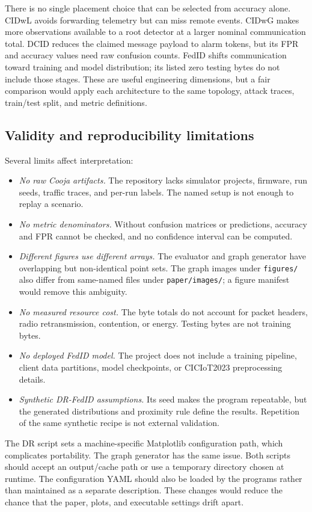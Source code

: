 \documentclass[conference]{IEEEtran}
\begin{document}
There is no single placement choice that can be selected from accuracy alone. CIDwL avoids forwarding telemetry but can miss remote events. CIDwG makes more observations available to a root detector at a larger nominal communication total. DCID reduces the claimed message payload to alarm tokens, but its FPR and accuracy values need raw confusion counts. FedID shifts communication toward training and model distribution; its listed zero testing bytes do not include those stages. These are useful engineering dimensions, but a fair comparison would apply each architecture to the same topology, attack traces, train/test split, and metric definitions.

\subsection{Validity and reproducibility limitations}
Several limits affect interpretation:
\begin{itemize}
    \item \textit{No raw Cooja artifacts.} The repository lacks simulator projects, firmware, run seeds, traffic traces, and per-run labels. The named setup is not enough to replay a scenario.
    \item \textit{No metric denominators.} Without confusion matrices or predictions, accuracy and FPR cannot be checked, and no confidence interval can be computed.
    \item \textit{Different figures use different arrays.} The evaluator and graph generator have overlapping but non-identical point sets. The graph images under \texttt{figures/} also differ from same-named files under \texttt{paper/images/}; a figure manifest would remove this ambiguity.
    \item \textit{No measured resource cost.} The byte totals do not account for packet headers, radio retransmission, contention, or energy. Testing bytes are not training bytes.
    \item \textit{No deployed FedID model.} The project does not include a training pipeline, client data partitions, model checkpoints, or CICIoT2023 preprocessing details.
    \item \textit{Synthetic DR-FedID assumptions.} Its seed makes the program repeatable, but the generated distributions and proximity rule define the results. Repetition of the same synthetic recipe is not external validation.
\end{itemize}

The DR script sets a machine-specific Matplotlib configuration path, which complicates portability. The graph generator has the same issue. Both scripts should accept an output/cache path or use a temporary directory chosen at runtime. The configuration YAML should also be loaded by the programs rather than maintained as a separate description. These changes would reduce the chance that the paper, plots, and executable settings drift apart.
\end{document}
